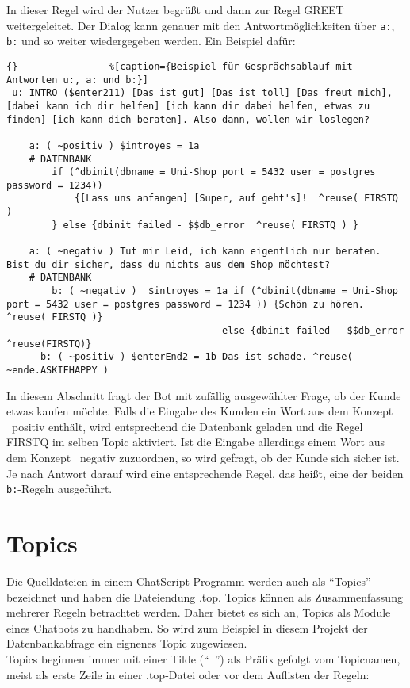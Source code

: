 In dieser Regel wird der Nutzer begrüßt und dann zur Regel GREET weitergeleitet.
Der Dialog kann genauer mit den Antwortmöglichkeiten über \lstinline|a:|, \lstinline|b:| und so weiter wiedergegeben werden. Ein Beispiel dafür:

\begin{lstlisting}{}				%[caption={Beispiel für Gesprächsablauf mit Antworten u:, a: und b:}]
 u: INTRO ($enter211) [Das ist gut] [Das ist toll] [Das freut mich], [dabei kann ich dir helfen] [ich kann dir dabei helfen, etwas zu finden] [ich kann dich beraten]. Also dann, wollen wir loslegen?

	a: ( ~positiv ) $introyes = 1a
	# DATENBANK
	    if (^dbinit(dbname = Uni-Shop port = 5432 user = postgres password = 1234))
	        {[Lass uns anfangen] [Super, auf geht's]!  ^reuse( FIRSTQ )
	    } else {dbinit failed - $$db_error  ^reuse( FIRSTQ ) }
			
	a: ( ~negativ ) Tut mir Leid, ich kann eigentlich nur beraten. Bist du dir sicher, dass du nichts aus dem Shop möchtest?
	# DATENBANK
		b: ( ~negativ )  $introyes = 1a if (^dbinit(dbname = Uni-Shop port = 5432 user = postgres password = 1234 )) {Schön zu hören. ^reuse( FIRSTQ )}
                                      else {dbinit failed - $$db_error ^reuse(FIRSTQ)}
	  b: ( ~positiv ) $enterEnd2 = 1b Das ist schade. ^reuse( ~ende.ASKIFHAPPY )
\end{lstlisting}

In diesem Abschnitt fragt der Bot mit zufällig ausgewählter Frage, ob der Kunde etwas kaufen möchte. Falls die Eingabe des Kunden ein Wort aus dem Konzept ~positiv enthält, wird entsprechend die Datenbank geladen und die Regel FIRSTQ im selben Topic aktiviert. Ist die Eingabe allerdings einem Wort aus dem Konzept ~negativ zuzuordnen, so wird gefragt, ob der Kunde sich sicher ist. Je nach Antwort darauf wird eine entsprechende Regel, das heißt, eine der beiden \lstinline|b:|-Regeln ausgeführt.\\ 


\section{Topics}
\label{sec:ChatScript: Topics}

Die Quelldateien in einem ChatScript-Programm werden auch als "`Topics"' bezeichnet und haben die Dateiendung .top. Topics können als Zusammenfassung mehrerer Regeln betrachtet werden. Daher bietet es sich an, Topics als Module eines Chatbots zu handhaben. So wird zum Beispiel in diesem Projekt der Datenbankabfrage ein eignenes Topic zugewiesen.\\
Topics beginnen immer mit einer Tilde ("`~"') als Präfix gefolgt vom Topicnamen, meist als erste Zeile in einer .top-Datei oder vor dem Auflisten der Regeln:

